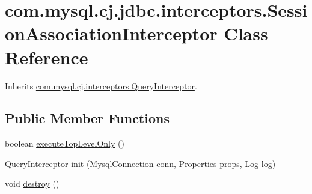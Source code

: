 \hypertarget{classcom_1_1mysql_1_1cj_1_1jdbc_1_1interceptors_1_1_session_association_interceptor}{}\section{com.\+mysql.\+cj.\+jdbc.\+interceptors.\+Session\+Association\+Interceptor Class Reference}
\label{classcom_1_1mysql_1_1cj_1_1jdbc_1_1interceptors_1_1_session_association_interceptor}


Inherits \mbox{\hyperlink{interfacecom_1_1mysql_1_1cj_1_1interceptors_1_1_query_interceptor}{com.\+mysql.\+cj.\+interceptors.\+Query\+Interceptor}}.

\subsection*{Public Member Functions}
\begin{DoxyCompactItemize}
\item 
boolean \mbox{\hyperlink{classcom_1_1mysql_1_1cj_1_1jdbc_1_1interceptors_1_1_session_association_interceptor_a86d3be9b55a93bb96f17d85e39e623c9}{execute\+Top\+Level\+Only}} ()
\item 
\mbox{\hyperlink{interfacecom_1_1mysql_1_1cj_1_1interceptors_1_1_query_interceptor}{Query\+Interceptor}} \mbox{\hyperlink{classcom_1_1mysql_1_1cj_1_1jdbc_1_1interceptors_1_1_session_association_interceptor_af6940dabb40c900b336fb6f5761160b6}{init}} (\mbox{\hyperlink{interfacecom_1_1mysql_1_1cj_1_1_mysql_connection}{Mysql\+Connection}} conn, Properties props, \mbox{\hyperlink{interfacecom_1_1mysql_1_1cj_1_1log_1_1_log}{Log}} log)
\item 
void \mbox{\hyperlink{classcom_1_1mysql_1_1cj_1_1jdbc_1_1interceptors_1_1_session_association_interceptor_a2bbe0b1b240f2ab943ba68fe979cf3a9}{destroy}} ()
\end{DoxyCompactItemize}
